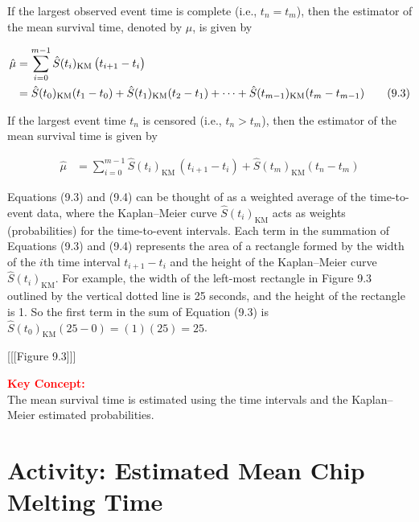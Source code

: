 \documentclass[
]{report}
\begin{document}
If the largest observed event time is complete (i.e., \(t_n = t_m\)), then the estimator of the mean survival time, denoted by \(\hat \mu\), is given by

\begin{align}
\hat \mu 
&= \sum_{i=0}^{m-1} \hat S(t_i)_{\mathrm{KM}} \,\bigl(t_{i+1} - t_i\bigr) \notag \\
&= \hat S(t_0)_{\mathrm{KM}}(t_1 - t_0) + \hat S(t_1)_{\mathrm{KM}}(t_2 - t_1) + \dots + \hat S(t_{m-1})_{\mathrm{KM}}(t_m - t_{m-1})
\tag{9.3}
\end{align}

If the largest event time \(t_n\) is censored (i.e., \(t_n > t_m\)), then the estimator of the mean survival time is given by

\begin{align}
\hat \mu 
&= \sum_{i=0}^{m-1} \hat S(t_i)_{\mathrm{KM}} \,(t_{i+1} - t_i) + \hat S(t_m)_{\mathrm{KM}}(t_n - t_m)
\tag{9.4}
\end{align}

Equations (9.3) and (9.4) can be thought of as a weighted average of the time-to-event data, where the Kaplan--Meier curve \(\hat S(t_i)_{\mathrm{KM}}\) acts as weights (probabilities) for the time-to-event intervals. Each term in the summation of Equations (9.3) and (9.4) represents the area of a rectangle formed by the width of the \(i\)th time interval \(t_{i+1} - t_i\) and the height of the Kaplan--Meier curve \(\hat S(t_i)_{\mathrm{KM}}\). For example, the width of the left-most rectangle in Figure 9.3 outlined by the vertical dotted line is 25 seconds, and the height of the rectangle is 1. So the first term in the sum of Equation (9.3) is \(\hat S(t_0)_{\mathrm{KM}}(25 - 0) = (1)(25) = 25\).

{[}{[}{[}Figure 9.3{]}{]}{]}

\large

\textbf{\textcolor{red}{Key Concept:}}\\
\color{red}
The mean survival time is estimated using the time intervals and the Kaplan--Meier estimated probabilities.\\
\color{black}
\normalsize

\section*{Activity: Estimated Mean Chip Melting Time}\label{activity-estimated-mean-chip-melting-time}
\end{document}
